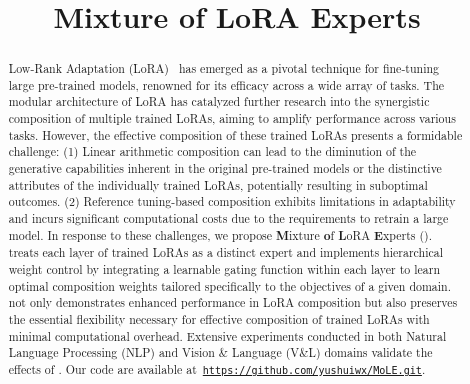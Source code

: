 \title{Mixture of LoRA Experts}



\maketitle

\begin{abstract}
Low-Rank Adaptation (LoRA)~\citep{lora} has emerged as a pivotal technique for fine-tuning large pre-trained models, renowned for its efficacy across a wide array of tasks. The modular architecture of LoRA has catalyzed further research into the synergistic composition of multiple trained LoRAs, aiming to amplify performance across various tasks. However, the effective composition of these trained LoRAs presents a formidable challenge:
(1) Linear arithmetic composition can lead to the diminution of the generative capabilities inherent in the original pre-trained models or the distinctive attributes of the individually trained LoRAs, potentially resulting in suboptimal outcomes.
(2) Reference tuning-based composition exhibits limitations in adaptability and incurs significant computational costs due to the requirements to retrain a large model.
In response to these challenges, we propose \textbf{M}ixture \textbf{o}f \textbf{L}oRA \textbf{E}xperts (\textbf{\our{}}). 
\our{} treats each layer of trained LoRAs as a distinct expert and implements hierarchical weight control by integrating a learnable gating function within each layer to learn optimal composition weights tailored specifically to the objectives of a given domain. 
\our{} not only demonstrates enhanced performance in LoRA composition but also preserves the essential flexibility necessary for effective composition of trained LoRAs with minimal computational overhead. Extensive experiments conducted in both Natural Language Processing (NLP) and Vision \& Language (V\&L) domains validate the effects of \our{}. Our code are available at~\href{https://github.com/yushuiwx/MoLE.git}{\texttt{https://github.com/yushuiwx/MoLE.git}}.
\end{abstract}

